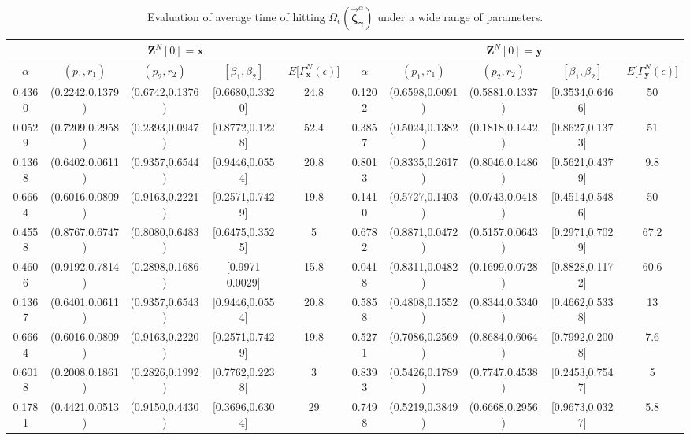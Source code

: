 \documentclass[11pt,twocolumn]{IEEEtran}
\begin{document}
\begin{table*}
\vspace{3pt}
\begin{center}
\renewcommand{\tabcolsep}{.1cm}
\renewcommand{\arraystretch}{1}
\begin{tabular}{|c|c|c|c|c||c|c|c|c|c|}
\hline
\multicolumn{5}{|c||}{$\bm Z^N[0]=\bm x$} & \multicolumn{5}{|c|}{$\bm Z^N[0]=\bm y$}\\
\hline
$\alpha$ & $(p_1,r_1)$ & $(p_2,r_2)$ & $[\beta_1,\beta_2]$ & $E\big[\Gamma_{\bm x}^N
(\epsilon)\big]$ & $\alpha$ & $(p_1,r_1)$ & $(p_2,r_2)$ & $[\beta_1,\beta_2]$ & $E\big[\Gamma_{\bm y}^N
(\epsilon)\big]$\\
\hline
0.4360 & (0.2242,0.1379) & (0.6742,0.1376) & [0.6680,0.3320] & 24.8 & 0.1202 & (0.6598,0.0091) & (0.5881,0.1337)  &  [0.3534,0.6466]  & 50\\
\hline
0.0529 & (0.7209,0.2958) & (0.2393,0.0947) & [0.8772,0.1228] & 52.4 & 0.3857 & (0.5024,0.1382) & (0.1818,0.1442)  &  [0.8627,0.1373]  & 51\\
\hline
0.1368 & (0.6402,0.0611) & (0.9357,0.6544) & [0.9446,0.0554] & 20.8 & 0.8013 & (0.8335,0.2617) & (0.8046,0.1486)  &  [0.5621,0.4379]  & 9.8\\
\hline
0.6664 & (0.6016,0.0809) & (0.9163,0.2221) & [0.2571,0.7429] & 19.8 & 0.1410 & (0.5727,0.1403) & (0.0743,0.0418)  &  [0.4514,0.5486]  & 50\\
\hline
0.4558 & (0.8767,0.6747) & (0.8080,0.6483) & [0.6475,0.3525] & 5 & 0.6782 & (0.8871,0.0472) & (0.5157,0.0643) &  [0.2971,0.7029]  & 67.2\\
\hline
0.4606 & (0.9192,0.7814) & (0.2898,0.1686) & [0.9971	0.0029] & 15.8 & 0.0418 & (0.8311,0.0482) & (0.1699,0.0728)  &  [0.8828,0.1172]  & 60.6\\
\hline
0.1367 & (0.6401,0.0611) & (0.9357,0.6543) & [0.9446,0.0554] & 20.8 & 0.5858 & (0.4808,0.1552) & (0.8344,0.5340)  &  [0.4662,0.5338]  & 13 \\
\hline
0.6664 & (0.6016,0.0809) & (0.9163,0.2220) & [0.2571,0.7429] & 19.8 & 0.5271 & (0.7086,0.2569) & (0.8684,0.6064)  &  [0.7992,0.2008]  & 7.6\\
\hline
0.6018 & (0.2008,0.1861) & (0.2826,0.1992) & [0.7762,0.2238] & 3 & 0.8393 & (0.5426,0.1789) & (0.7747,0.4538)  &  [0.2453,0.7547]  & 5\\
\hline
0.1781 & (0.4421,0.0513) & (0.9150,0.4430) & [0.3696,0.6304] & 29 & 0.7498 & (0.5219,0.3849) & (0.6668,0.2956)  &  [0.9673,0.0327]  & 5.8\\
\hline
\end{tabular}
\end{center}
\caption{Evaluation of average time of hitting $\Omega_{\epsilon}(\vec{\bm \zeta}^{\alpha}_{\bm \gamma})$ under a wide range of parameters.}
\label{tab:tab4}
\vspace{-10pt}
\end{table*}
\end{document}
